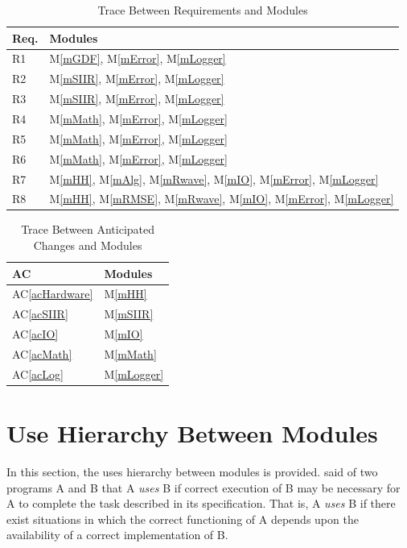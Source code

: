 \documentclass[12pt, titlepage]{article}
\newcommand{\acref}[1]{AC\ref{#1}}
\newcommand{\mref}[1]{M\ref{#1}}
\begin{document}
\begin{table}[H]
\centering
\begin{tabular}{p{} p{}}
\toprule
\textbf{Req.} & \textbf{Modules}\\
\midrule
R1 & \mref{mGDF}, \mref{mError}, \mref{mLogger}\\
R2 & \mref{mSIIR}, \mref{mError}, \mref{mLogger}\\
R3 & \mref{mSIIR}, \mref{mError}, \mref{mLogger}\\
R4 & \mref{mMath}, \mref{mError}, \mref{mLogger}\\
R5 & \mref{mMath}, \mref{mError}, \mref{mLogger}\\
R6 & \mref{mMath}, \mref{mError}, \mref{mLogger}\\
R7 & \mref{mHH}, \mref{mAlg}, \mref{mRwave}, \mref{mIO}, \mref{mError},
\mref{mLogger}\\
R8 & \mref{mHH}, \mref{mRMSE}, \mref{mRwave}, \mref{mIO}, \mref{mError},
\mref{mLogger}\\
\bottomrule
\end{tabular}
\caption{Trace Between Requirements and Modules}
\label{TblRT}
\end{table}

\begin{table}[H]
\centering
\begin{tabular}{p{} p{}}
\toprule
\textbf{AC} & \textbf{Modules}\\
\midrule
\acref{acHardware} & \mref{mHH}\\
\acref{acSIIR} & \mref{mSIIR}\\
\acref{acIO} & \mref{mIO}\\
\acref{acMath} & \mref{mMath}\\
\acref{acLog} & \mref{mLogger}\\
\bottomrule
\end{tabular}
\caption{Trace Between Anticipated Changes and Modules}
\label{TblACT}
\end{table}

\section{Use Hierarchy Between Modules} \label{SecUse}

In this section, the uses hierarchy between modules is provided.
\citet{Parnas1978} said of two programs A and B that A {\em uses} B if correct
execution of B may be necessary for A to complete the task described in its
specification. That is, A {\em uses} B if there exist situations in which the
correct functioning of A depends upon the availability of a correct
implementation of B.
\end{document}
